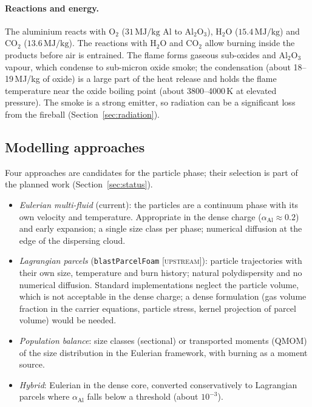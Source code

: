 \documentclass{article}
\newcommand{\up}{\textsc{[upstream]}}
\begin{document}
\paragraph{Reactions and energy.} The aluminium reacts with O$_2$ ($31\,\text{MJ/kg}$ Al to Al$_2$O$_3$), H$_2$O ($15.4\,\text{MJ/kg}$) and CO$_2$ ($13.6\,\text{MJ/kg}$). The reactions with H$_2$O and CO$_2$ allow burning inside the products before air is entrained. The flame forms gaseous sub-oxides and Al$_2$O$_3$ vapour, which condense to sub-micron oxide smoke; the condensation (about 18--19\,MJ/kg of oxide) is a large part of the heat release and holds the flame temperature near the oxide boiling point (about 3800--4000\,K at elevated pressure). The smoke is a strong emitter, so radiation can be a significant loss from the fireball (Section~\ref{sec:radiation}).

\subsection{Modelling approaches}
\label{sec:al_approaches}

Four approaches are candidates for the particle phase; their selection is part of the planned work (Section~\ref{sec:status}).
\begin{itemize}
    \item \emph{Eulerian multi-fluid} (current): the particles are a continuum phase with its own velocity and temperature. Appropriate in the dense charge ($\alpha_\text{Al} \approx 0.2$) and early expansion; a single size class per phase; numerical diffusion at the edge of the dispersing cloud.
    \item \emph{Lagrangian parcels} (\texttt{blastParcelFoam} \up): particle trajectories with their own size, temperature and burn history; natural polydispersity and no numerical diffusion. Standard implementations neglect the particle volume, which is not acceptable in the dense charge; a dense formulation (gas volume fraction in the carrier equations, particle stress, kernel projection of parcel volume) would be needed.
    \item \emph{Population balance}: size classes (sectional) or transported moments (QMOM) of the size distribution in the Eulerian framework, with burning as a moment source.
    \item \emph{Hybrid}: Eulerian in the dense core, converted conservatively to Lagrangian parcels where $\alpha_\text{Al}$ falls below a threshold (about $10^{-3}$).
\end{itemize}
\end{document}
